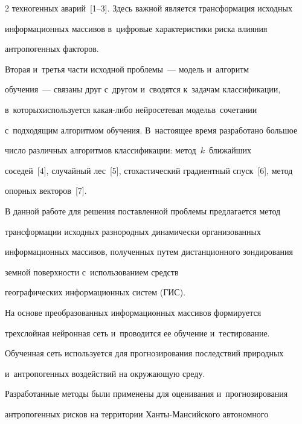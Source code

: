 \begin{multicols}{2}
техногенных аварий~[1--3]. Здесь важной является трансформация исходных 


информационных массивов в~цифровые характеристики риска влияния 


антропогенных факторов.


  


  Вторая и~третья части исходной проблемы~--- модель и~алгоритм  


обучения~--- связаны друг с~другом и~сводятся к~задачам классификации, 


в~которых\linebreak используется какая-либо нейросетевая модель\linebreak в~сочетании 


с~подходящим алгоритмом обучения. В~настоящее время разработано большое 


число различных алгоритмов классификации: метод~$k$~ближайших 


соседей~[4], случайный лес~[5], стохастический градиентный спуск~[6], метод 


опорных векторов~[7]. 


  


  В данной работе для решения поставленной проблемы предлагается метод 


трансформации исходных разнородных динамически организованных 


информационных массивов, полученных путем дис\-тан\-ци\-он\-но\-го зондирования 


земной поверхности с~использованием средств 


географических информационных сис\-тем (ГИС).


  


  На основе преобразованных информационных массивов формируется 


трехслойная нейронная сеть и~проводится ее обучение и~тестирование. 


Обученная сеть используется для прогнозирования последствий природных 


и~антропогенных воздействий на окружающую среду. 


  


  Разработанные методы были применены для оценивания и~прогнозирования 


антропогенных рисков на территории Хан\-ты-Ман\-сий\-ско\-го автономного 



\end{multicols}
